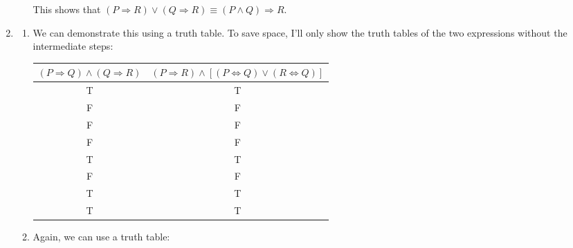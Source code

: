 \documentclass{article}
\begin{document}
\begin{enumerate}
\begin{enumerate}
     This shows that $(P \Rightarrow R) \lor (Q \Rightarrow R) \equiv (P \land Q) \Rightarrow R$.
  \end{enumerate}

\item
  \begin{enumerate}
    \item
      We can demonstrate this using a truth table.  To save space, I'll only show the truth tables of the two expressions without the intermediate steps:

      \begin{tabular}{c c}
        $(P \Rightarrow Q) \land (Q \Rightarrow R)$ & $(P \Rightarrow R) \land [(P \iff Q) \lor (R \iff Q)]$ \\ \hline
        T & T \\
        F & F \\
        F & F \\
        F & F \\
        T & T \\
        F & F \\
        T & T \\
        T & T \\
      \end{tabular}
    \item
      Again, we can use a truth table:


\end{enumerate}
\end{enumerate}
\end{document}
